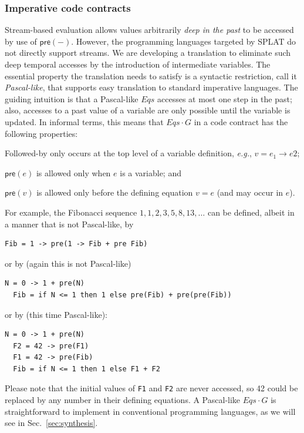 \documentclass[global,twocolumn]{svjour}
\newcommand{\konst}[1]{\ensuremath{\mathsf{#1}}}
\newcommand{\Eqs}{\ensuremath{\mathit{Eqs}}}
\newcommand{\secref}[1]{Sec.~\ref{#1}}
\newcommand{\eg}{\textit{e.g.}}
\begin{document}

\subsubsection*{Imperative code contracts}

Stream-based evaluation allows values arbitrarily \emph{deep in the past} to be accessed by use of $\konst{pre}(-)$.
%
However, the programming languages targeted by SPLAT do not directly support streams.
%
We are developing a translation to eliminate such deep temporal accesses by the introduction of intermediate variables.
%
The essential property the translation needs to satisfy is a syntactic restriction, call it \emph{Pascal-like}, that supports easy translation to standard imperative languages.
%
The guiding intuition is that a Pascal-like {\Eqs} accesses at most one step in the past;
%
also, accesses to a past value of a variable are only possible until the variable is updated.
%
In informal terms, this means that ${\Eqs}\cdot G$ in a code contract has the following properties:
%
\begin{compactitem}
\item Followed-by only occurs at the top level of a variable definition, \eg, $v = e_1 \to e2$;
\item $\konst{pre}(e)$ is allowed only when $e$ is a variable; and
\item $\konst{pre}(v)$ is allowed only before the defining equation $v = e$ (and may occur in $e$).
\end{compactitem}
%
For example, the Fibonacci sequence $1,1,2,3,5,8,13,\ldots$ can be defined, albeit in a manner that is not Pascal-like, by
%
{\small
\begin{lstlisting}[style=agree]
  Fib = 1 -> pre(1 -> Fib + pre Fib)
\end{lstlisting}
}
%
\noindent or by (again this is not Pascal-like)
%
{\small
\begin{lstlisting}[style=agree]
  N = 0 -> 1 + pre(N)
  Fib = if N <= 1 then 1 else pre(Fib) + pre(pre(Fib))
\end{lstlisting}
}
%
\noindent or by (this time Pascal-like):
%
{\small
\begin{lstlisting}[style=agree]
  N = 0 -> 1 + pre(N)
  F2 = 42 -> pre(F1)
  F1 = 42 -> pre(Fib)
  Fib = if N <= 1 then 1 else F1 + F2
\end{lstlisting}
}
%
Please note that the initial values of \verb+F1+ and \verb+F2+ are never accessed, so 42 could be replaced by any number in their defining equations.
%
A Pascal-like ${\Eqs} \cdot G$ is straightforward to implement in conventional programming languages, as we will see in \secref{sec:synthesis}.
\end{document}
